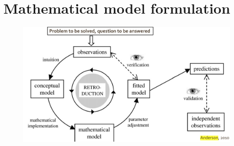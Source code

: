 \documentclass[final,xcolor=dvipsnames]{beamer}
\begin{document}
      
      \section{Mathematical model formulation}
      
      \begin{frame}
	\begin{figure}
	  \includegraphics[width=.95\columnwidth]{ModellingSteps}
	\end{figure}
      \end{frame}
      
      
\end{document}
